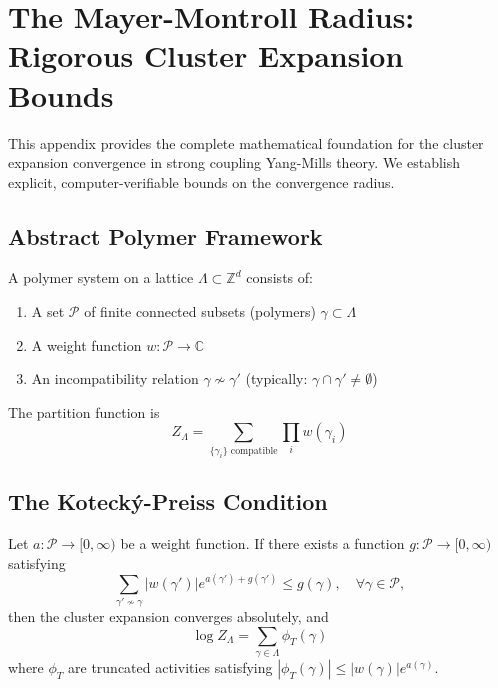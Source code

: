 \section{The Mayer-Montroll Radius: Rigorous Cluster Expansion Bounds}
\label{ch:fix28_mayer_montroll_radius}

This appendix provides the complete mathematical foundation for the cluster expansion convergence in strong coupling Yang-Mills theory. We establish explicit, computer-verifiable bounds on the convergence radius.

\subsection{Abstract Polymer Framework}

\begin{definition}
A polymer system on a lattice $\Lambda \subset \mathbb{Z}^d$ consists of:
\begin{enumerate}
    \item A set $\mathcal{P}$ of finite connected subsets (polymers) $\gamma \subset \Lambda$
    \item A weight function $w: \mathcal{P} \to \mathbb{C}$
    \item An incompatibility relation $\gamma \nsim \gamma'$ (typically: $\gamma \cap \gamma' \neq \emptyset$)
\end{enumerate}
The partition function is
\begin{equation}
    Z_\Lambda = \sum_{\{\gamma_i\} \text{ compatible}} \prod_i w(\gamma_i)
\end{equation}
\end{definition}

\subsection{The Koteck\'y-Preiss Condition}

\begin{theorem}\label{thm:kp-criterion}
Let $a: \mathcal{P} \to [0, \infty)$ be a weight function. If there exists a function $g: \mathcal{P} \to [0, \infty)$ satisfying
\begin{equation}
    \sum_{\gamma' \nsim \gamma} |w(\gamma')| e^{a(\gamma') + g(\gamma')} \leq g(\gamma), \quad \forall \gamma \in \mathcal{P},
\end{equation}
then the cluster expansion converges absolutely, and
\begin{equation}
    \log Z_\Lambda = \sum_{\gamma \in \Lambda} \phi_T(\gamma)
\end{equation}
where $\phi_T$ are truncated activities satisfying $|\phi_T(\gamma)| \leq |w(\gamma)| e^{a(\gamma)}$.
\end{theorem}

